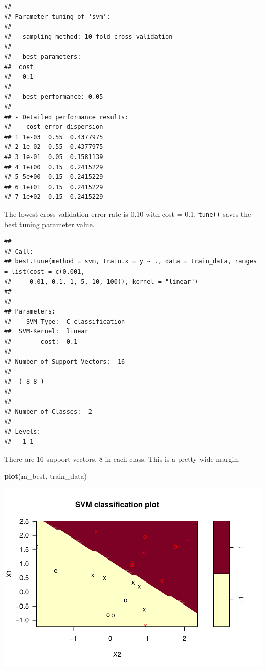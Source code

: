 \documentclass[
]{book}
\newenvironment{Shaded}{\begin{snugshade}}{\end{snugshade}}
\newcommand{\KeywordTok}[1]{\textcolor[rgb]{0.13,0.29,0.53}{\textbf{#1}}}
\newcommand{\NormalTok}[1]{#1}
\newcommand{\OperatorTok}[1]{\textcolor[rgb]{0.81,0.36,0.00}{\textbf{#1}}}
\newcommand{\StringTok}[1]{\textcolor[rgb]{0.31,0.60,0.02}{#1}}
\begin{document}
\begin{verbatim}
## 
## Parameter tuning of 'svm':
## 
## - sampling method: 10-fold cross validation 
## 
## - best parameters:
##  cost
##   0.1
## 
## - best performance: 0.05 
## 
## - Detailed performance results:
##    cost error dispersion
## 1 1e-03  0.55  0.4377975
## 2 1e-02  0.55  0.4377975
## 3 1e-01  0.05  0.1581139
## 4 1e+00  0.15  0.2415229
## 5 5e+00  0.15  0.2415229
## 6 1e+01  0.15  0.2415229
## 7 1e+02  0.15  0.2415229
\end{verbatim}

The lowest cross-validation error rate is 0.10 with cost = 0.1. \texttt{tune()} saves the best tuning parameter value.

\begin{Shaded}
\end{Shaded}

\begin{verbatim}
## 
## Call:
## best.tune(method = svm, train.x = y ~ ., data = train_data, ranges = list(cost = c(0.001, 
##     0.01, 0.1, 1, 5, 10, 100)), kernel = "linear")
## 
## 
## Parameters:
##    SVM-Type:  C-classification 
##  SVM-Kernel:  linear 
##        cost:  0.1 
## 
## Number of Support Vectors:  16
## 
##  ( 8 8 )
## 
## 
## Number of Classes:  2 
## 
## Levels: 
##  -1 1
\end{verbatim}

There are 16 support vectors, 8 in each class. This is a pretty wide margin.

\begin{Shaded}
\begin{Highlighting}[]
\KeywordTok{plot}\NormalTok{(m_best, train_data)}
\end{Highlighting}
\end{Shaded}

\includegraphics{data-sci_files/figure-latex/unnamed-chunk-104-1.pdf}
\end{document}
